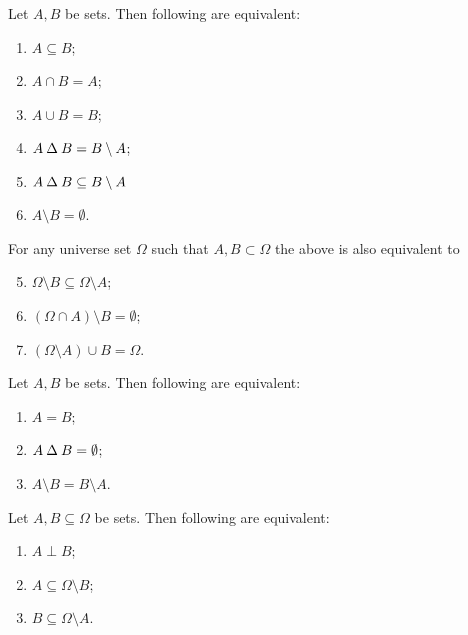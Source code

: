 \begin{lemma}
Let $A,B$ be sets. Then following are equivalent:
\begin{enumerate}
\item $A\subseteq B$;
\item $A\cap B = A$;
\item $A\cup B = B$;
\item $A\mathbin{\Delta} B = B\setminus A$;
\item $A\mathbin{\Delta} B \subseteq B\setminus A$
\item $A\setminus B = \emptyset$.
\end{enumerate}
For any universe set $\Omega$ such that $A,B\subset \Omega$ the above is also equivalent to
\begin{enumerate}\setcounter{enumi}{4}
\item $\Omega\setminus B \subseteq \Omega\setminus A$;
\item $(\Omega\cap A)\setminus B = \emptyset$;
\item $(\Omega\setminus A)\cup B = \Omega$.
\end{enumerate}
\end{lemma}
\begin{corollary}
Let $A,B$ be sets. Then following are equivalent:
\begin{enumerate}
\item $A=B$;
\item $A\mathbin{\Delta} B = \emptyset$;
\item $A\setminus B = B\setminus A$.
\end{enumerate}
\end{corollary}
\begin{corollary} \label{setPerpInequality}
Let $A,B\subseteq \Omega$ be sets. Then following are equivalent:
\begin{enumerate}
\item $A\perp B$;
\item $A \subseteq \Omega\setminus B$;
\item $B \subseteq \Omega\setminus A$.
\end{enumerate}
\end{corollary}

